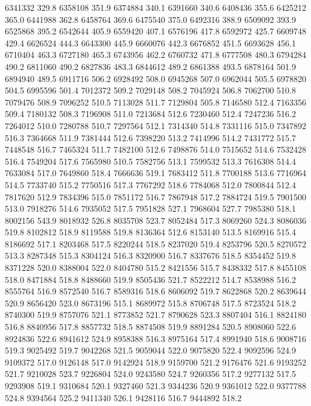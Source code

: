 6341332 329.8
6358108 351.9
6374884 340.1
6391660 340.6
6408436 355.6
6425212 365.0
6441988 362.8
6458764 369.6
6475540 375.0
6492316 388.9
6509092 393.9
6525868 395.2
6542644 405.9
6559420 407.1
6576196 417.8
6592972 425.7
6609748 429.4
6626524 444.3
6643300 445.9
6660076 442.3
6676852 451.5
6693628 456.1
6710404 463.3
6727180 465.3
6743956 462.2
6760732 471.8
6777508 480.3
6794284 490.2
6811060 490.2
6827836 483.3
6844612 489.2
6861388 493.5
6878164 501.9
6894940 489.5
6911716 506.2
6928492 508.0
6945268 507.0
6962044 505.5
6978820 504.5
6995596 501.4
7012372 509.2
7029148 508.2
7045924 506.8
7062700 510.8
7079476 508.9
7096252 510.5
7113028 511.7
7129804 505.8
7146580 512.4
7163356 509.4
7180132 508.3
7196908 511.0
7213684 512.6
7230460 512.4
7247236 516.2
7264012 510.0
7280788 510.7
7297564 512.1
7314340 514.8
7331116 515.0
7347892 516.3
7364668 511.9
7381444 512.6
7398220 513.2
7414996 514.2
7431772 515.7
7448548 516.7
7465324 511.7
7482100 512.6
7498876 514.0
7515652 514.6
7532428 516.4
7549204 517.6
7565980 510.5
7582756 513.1
7599532 513.3
7616308 514.4
7633084 517.0
7649860 518.4
7666636 519.1
7683412 511.8
7700188 513.6
7716964 514.5
7733740 515.2
7750516 517.3
7767292 518.6
7784068 512.0
7800844 512.4
7817620 512.9
7834396 515.0
7851172 516.7
7867948 517.2
7884724 519.5
7901500 513.0
7918276 514.6
7935052 517.5
7951828 527.1
7968604 527.7
7985380 518.1
8002156 543.9
8018932 526.8
8035708 523.7
8052484 517.3
8069260 524.3
8086036 519.8
8102812 518.9
8119588 519.8
8136364 512.6
8153140 513.5
8169916 515.4
8186692 517.1
8203468 517.5
8220244 518.5
8237020 519.4
8253796 520.5
8270572 513.3
8287348 515.3
8304124 516.3
8320900 516.7
8337676 518.5
8354452 519.8
8371228 520.0
8388004 522.0
8404780 515.2
8421556 515.7
8438332 517.8
8455108 518.0
8471884 518.8
8488660 519.9
8505436 521.7
8522212 514.7
8538988 516.2
8555764 516.9
8572540 516.7
8589316 518.6
8606092 519.7
8622868 520.2
8639644 520.9
8656420 523.0
8673196 515.1
8689972 515.8
8706748 517.5
8723524 518.2
8740300 519.9
8757076 521.1
8773852 521.7
8790628 523.3
8807404 516.1
8824180 516.8
8840956 517.8
8857732 518.5
8874508 519.9
8891284 520.5
8908060 522.6
8924836 522.6
8941612 524.9
8958388 516.3
8975164 517.4
8991940 518.6
9008716 519.3
9025492 519.7
9042268 521.5
9059044 522.0
9075820 522.4
9092596 524.9
9109372 517.0
9126148 517.0
9142924 518.9
9159700 521.2
9176476 521.6
9193252 521.7
9210028 523.7
9226804 524.0
9243580 524.7
9260356 517.2
9277132 517.5
9293908 519.1
9310684 520.1
9327460 521.3
9344236 520.9
9361012 522.0
9377788 524.8
9394564 525.2
9411340 526.1
9428116 516.7
9444892 518.2
